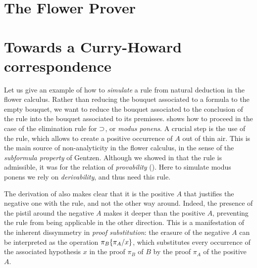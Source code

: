 \section{The Flower Prover}


\section{Towards a Curry-Howard correspondence}



Let us give an example of how to \emph{simulate} a rule from natural deduction
in the flower calculus. Rather than reducing the bouquet associated to a formula
to the empty bouquet, we want to reduce the bouquet associated to the conclusion
of the rule into the bouquet associated to its premisses. 
shows how to proceed in the case of the elimination rule for $\supset$, or
\emph{modus ponens}. A crucial step is the use of the  rule, which
allows to create a positive occurrence of $A$ out of thin air. This is the main
source of non-analyticity in the flower calculus, in the sense of the
\emph{subformula property} of Gentzen. Although we showed in
 that the  rule is admissible, it was for the
relation of \emph{provability} (). Here to simulate modus
ponens we rely on \emph{derivability}, and thus need this rule.

The derivation of  also makes clear that it is the positive
$A$ that justifies the negative one with the  rule, and not
the other way around. Indeed, the presence of the pistil around the negative $A$
makes it deeper than the positive $A$, preventing the  rule
from being applicable in the other direction. This is a manifestation of the
inherent dissymmetry in \emph{proof substitution}: the erasure of the negative
$A$ can be interpreted as the operation $\pi_B \{ \pi_A / x \}$, which
substitutes every occurrence of the associated hypothesis $x$ in the proof
$\pi_B$ of $B$ by the proof $\pi_A$ of the positive $A$.



